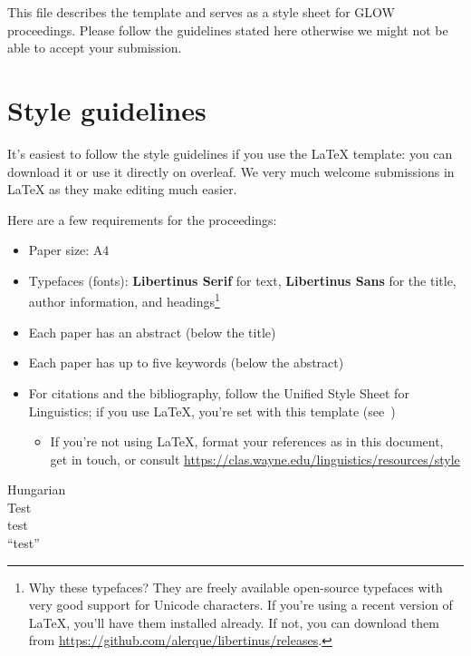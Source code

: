 This file describes the template and serves as a style sheet for GLOW proceedings.
Please follow the guidelines stated here otherwise we might not be able to accept
your submission.

\section{Style guidelines}

It's easiest to follow the style guidelines if you use the \LaTeX{} template:
you can download it or use it directly on overleaf. We very much welcome
submissions in \LaTeX{} as they make editing much easier.

Here are a few requirements for the proceedings:

\begin{itemize}
    \item Paper size: A4
    \item Typefaces (fonts): \textbf{Libertinus Serif} for text,
        \textbf{Libertinus Sans} for the title, author information, and
        headings\footnote{Why these typefaces? They are freely available
        open-source typefaces with very good support for Unicode characters.
        If you're using a recent version of \LaTeX{}, you'll have them
        installed already. If not, you can download them from
    \url{https://github.com/alerque/libertinus/releases}.}
    \item Each paper has an abstract (below the title)
    \item Each paper has up to five keywords (below the abstract)
    \item For citations and the bibliography, follow the Unified Style Sheet
        for Linguistics; if you use \LaTeX{}, you're set with this template
        (see~)
        \begin{itemize}
            \item If you're not using \LaTeX{}, format your references as in
                this document, get in touch, or consult
                \url{https://clas.wayne.edu/linguistics/resources/style}
        \end{itemize}
\end{itemize}

\ea Hungarian \parencite{EKiss2008}\\
    \gll Test\\
         test\\
    \glt \enquote{test}
\z

%
%

